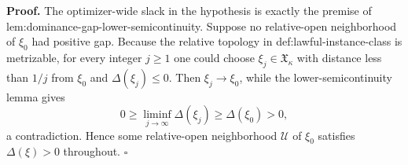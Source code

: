 \textbf{Proof.}
The optimizer-wide slack in the hypothesis is exactly the premise of lem:dominance-gap-lower-semicontinuity.  Suppose no relative-open neighborhood of \(\xi_0\) had positive gap.  Because the relative topology in def:lawful-instance-class is metrizable, for every integer \(j\ge1\) one could choose \(\xi_j\in\mathfrak X_\kappa\) with distance less than \(1/j\) from \(\xi_0\) and \(\Delta(\xi_j)\le0\).  Then \(\xi_j\to\xi_0\), while the lower-semicontinuity lemma gives
\[
0\ge\liminf_{j\to\infty}\Delta(\xi_j)\ge\Delta(\xi_0)>0,
\]
a contradiction.  Hence some relative-open neighborhood \(\mathcal U\) of \(\xi_0\) satisfies \(\Delta(\xi)>0\) throughout. \(\square\)